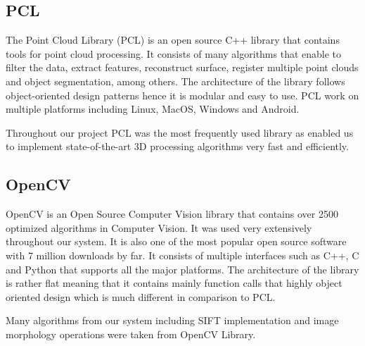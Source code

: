 \subsection{PCL}
The Point Cloud Library (PCL) is an open source C++ library that contains tools for point cloud processing. It consists of many algorithms that enable to filter the data, extract features, reconstruct surface, register multiple point clouds and object segmentation, among others. The architecture of the library follows object-oriented design patterns hence it is modular and easy to use. PCL work on multiple platforms including Linux, MacOS, Windows and Android. 

Throughout our project PCL was the most frequently used library as enabled us to implement state-of-the-art 3D processing algorithms very fast and efficiently.  

\subsection{OpenCV}
OpenCV is an Open Source Computer Vision library that contains over 2500 optimized algorithms in Computer Vision. It was used very extensively throughout our system. It is also one of the most popular open source software with 7 million downloads by far. It consists of multiple interfaces such as C++, C and Python that supports all the major platforms. The architecture of the library is rather flat meaning that it contains mainly function calls that highly object oriented design which is much different in comparison to PCL.

Many algorithms from our system including SIFT implementation and image morphology operations were taken from OpenCV Library. 








